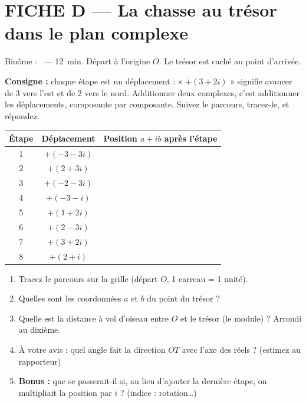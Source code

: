 \documentclass[11pt,a4paper]{article}
\newcommand{\pointilles}{\makebox[3.5cm]{\dotfill}}
\begin{document}
\pointilles\par
\pointilles

\newpage
\section*{FICHE D --- La chasse au trésor dans le plan complexe}

Binôme : \pointilles\ --- 12~min. Départ à l'origine $O$. Le trésor est caché
au point d'arrivée.

\textbf{Consigne :} chaque étape est un déplacement : « $+(3 + 2i)$ »
signifie avancer de 3 vers l'est et de 2 vers le nord. Additionner deux
complexes, c'est additionner les déplacements, composante par composante.
Suivez le parcours, tracez-le, et répondez.

\begin{center}
\begin{tabular}{|c|c|c|}
  \hline
  \textbf{Étape} & \textbf{Déplacement} & \textbf{Position $a + ib$ après l'étape} \\
  \hline
  1 & $+(-3 - 3i)$ & \\ \hline
  2 & $+(2 + 3i)$  & \\ \hline
  3 & $+(-2 - 3i)$ & \\ \hline
  4 & $+(-3 - i)$  & \\ \hline
  5 & $+(1 + 2i)$  & \\ \hline
  6 & $+(2 - 3i)$  & \\ \hline
  7 & $+(3 + 2i)$  & \\ \hline
  8 & $+(2 + i)$   & \\ \hline
\end{tabular}
\end{center}

\begin{enumerate}
  \item Tracez le parcours sur la grille (départ $O$, 1 carreau = 1 unité).
  \item Quelles sont les coordonnées $a$ et $b$ du point du trésor ?
  \item Quelle est la distance à vol d'oiseau entre $O$ et le trésor (le
        module) ? Arrondi au dixième.
  \item À votre avis : quel angle fait la direction $OT$ avec l'axe des
        réels ? (estimez au rapporteur)
  \item \textbf{Bonus :} que se passerait-il si, au lieu d'ajouter la dernière
        étape, on multipliait la position par $i$ ? (indice : rotation\dots)
\end{enumerate}
\end{document}

